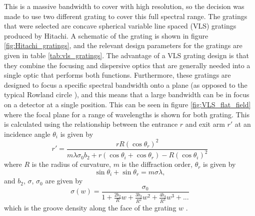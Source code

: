 This is a massive bandwidth to cover with high resolution, so the decision was made to use two different grating to cover this full spectral range.  The gratings that were selected are concave spherical variable line spaced (VLS) gratings produced by Hitachi.  A schematic of the grating is shown in figure \ref{fig:Hitachi_gratings}, and the relevant design parameters for the gratings are given in table \ref{tab:vls_gratings}.  The advantage of a VLS grating design is that they combine the focusing and dispersive optics that are generally needed into a single optic that performs both functions.  Furthermore, these gratings are designed to focus a specific spectral bandwidth onto a plane (as opposed to the typical Rowland circle \cite{rowlandConcaveGratingsOptical1883, pedrottiIntroductionOptics2007}), and this means that a large bandwidth can be in focus on a detector at a single position.  This can be seen in figure \ref{fig:VLS_flat_field} where the focal plane for a range of wavelengths is shown for both grating. This is calculated using the relationship between the entrance $r$ and exit arm $r'$ at an incidence angle $\theta_i$ is given by
\begin{equation}
	r' = \frac{r R (\cos\theta_r)^2}{m\lambda\sigma_0 b_2 + r(\cos\theta_i + \cos\theta_r) - R(\cos\theta_i)^2}
\end{equation}
where $R$ is the radius of curvature, $m$ is the diffraction order, $\theta_r$ is given by
\begin{equation}
	\sin\theta_i + \sin\theta_r = m\sigma\lambda,
\end{equation}
and $b_2$, $\sigma$, $\sigma_0$ are given by 
\begin{equation}
	\sigma(w) = \frac{\sigma_0}{1 + \frac{2b_2}{R}w + \frac{3b_3}{R^2}w^2 + \frac{4b_4}{R^3}w^3 + ...}
\end{equation}
which is the groove density along the face of the grating $w$ \cite{polettoGrazingincidenceFlatfieldSpectrometer2001, haradaMechanicallyRuledAberrationcorrected1980, haradaOptimumDesignGrazingincidence1999}.
